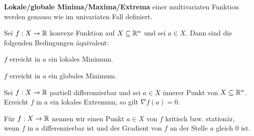 \begin{defn}
	\textbf{Lokale/globale Minima/Maxima/Extrema} einer multivariaten Funktion werden genauso wie  im univariaten Fall definiert. 
\end{defn}

\begin{thm}
 	Sei $f : X \to \mathbb{R}$ konvexe Funktion auf $X \subseteq \mathbb{R}^n$ und sei $a \in X$. Dann sind die folgenden Bedingungen äquivalent: 
 	\begin{enumi}
 		\item $f$ erreicht in $a$ ein lokales Minimum. 
 		\item $f$ erreicht in $a$ ein globales Minimum. 
 	\end{enumi} 
\end{thm} 


\begin{thm} 
	Sei $f : X \to \mathbb{R}$ partiell differenzierbar und sei $a \in X$ innerer Punkt von $X \subseteq \mathbb{R}^n$. Erreicht $f$ in $a$ ein lokales Extremum, so gilt $\nabla f(a) =0$. 
\end{thm} 

\begin{defn} 
	Für $f : X \to \mathbb{R}$ nennen wir einen Punkt $a \in X$ von $f$ kritisch bzw. stationär, wenn $f$ in $a$ differenzierbar ist und der Gradient von $f$ an der Stelle $a$ gleich $0$ ist. 
\end{defn} 

